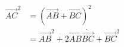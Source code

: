 \documentclass[preview]{standalone}
\begin{document}
\begin{align*}
\overrightarrow{AC}^2 &= (\overrightarrow{AB} + \overrightarrow{BC})^2\\&= \overrightarrow{AB}^2 + 2\overrightarrow{AB}\dot\overrightarrow{BC} + \overrightarrow{BC}^2
\end{align*}
\end{document}
